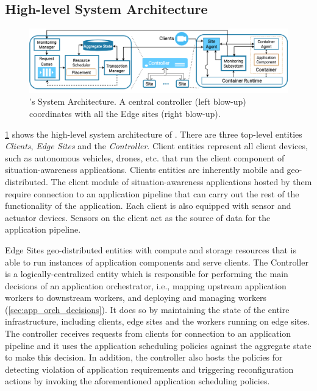 \subsection{High-level System Architecture}
\begin{figure}[t]
\centering
\includegraphics[width=0.85\columnwidth]{figures/oneedge/onefog_overview.png}
\caption{\oneedge{}'s System Architecture. A central controller (left blow-up) coordinates with all the Edge sites (right blow-up).}
\label{fig:system_arch}
\vspace{-2mm}
\end{figure}
\cref{fig:system_arch} shows the high-level system architecture of \oneedge{}. There are three top-level entities \textit{Clients}, \textit{Edge Sites} and the \textit{Controller}. 
Client entities represent all client devices, such as autonomous vehicles, drones, etc. that run the client component of situation-awareness applications. Clients entities are inherently mobile and geo-distributed. The client module of situation-awareness applications hosted by them require connection to an application pipeline that can carry out the rest of the functionality of the application. Each client is also equipped with sensor and actuator devices. Sensors on the client act as the source of data for the application pipeline. 
\par Edge Sites geo-distributed entities with compute and storage resources that is able to run instances of application components and serve clients. The Controller is a logically-centralized entity which is responsible for performing the main decisions of an application orchestrator, i.e., mapping upstream application workers to downstream workers, and deploying and managing workers (\cref{sec:app_orch_decisions}). It does so by maintaining the state of the entire infrastructure, including clients, edge sites and the workers running on edge sites. The controller receives requests from clients for connection to an application pipeline and it uses the application scheduling policies against the aggregate state to make this decision. In addition, the controller also hosts the policies for detecting violation of application requirements and triggering reconfiguration actions by invoking the aforementioned application scheduling policies.

